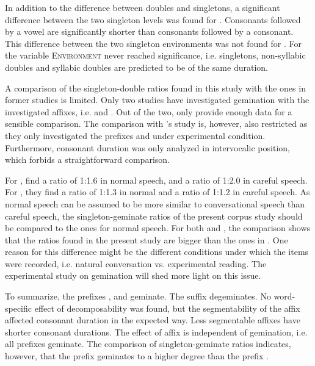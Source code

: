 In addition to the difference between doubles and singletons, a significant difference between the two singleton levels was found for . Consonants followed by a vowel are significantly shorter than consonants followed by a consonant. This difference between the two singleton environments was not found for . For  the variable \textsc{Environment} never reached significance, i.e. singletons, non-syllabic doubles and syllabic doubles are predicted to be of the same duration.

 A comparison of the singleton-double ratios found in this study with the ones in former studies is limited. Only two studies have investigated gemination with the investigated affixes, i.e. \cite{Kaye.2005} and \cite{Oh.2012}. Out of the two, only \cite{Oh.2012} provide enough data for a sensible comparison. The comparison with \citeauthor{Oh.2012}'s study is, however, also restricted as they only investigated the prefixes  and  under experimental condition. Furthermore, consonant duration was only analyzed in intervocalic position, which forbids a straightforward comparison. 
 
 For , \cite{Oh.2012} find a ratio of 1:1.6 in normal speech, and a ratio of 1:2.0 in careful speech. For , they find a ratio of 1:1.3 in normal and a ratio of 1:1.2 in careful speech. 
 As normal speech can be assumed to be more similar to conversational speech than careful speech, the singleton-geminate ratios of the present corpus study should be compared to the ones for normal speech. 
 For both  and , the comparison shows that the ratios found in the present study are bigger than the ones in \cite{Oh.2012}. 
  One reason for this difference might be the different conditions under which the items were recorded, i.e. natural conversation vs. experimental reading. The experimental study on gemination will shed more light on this issue.

To summarize, the prefixes ,  and  geminate. The suffix  degeminates. No word-specific effect of decomposability was found, but the segmentability of the affix affected consonant duration in the expected way. Less segmentable affixes have shorter consonant durations. The effect of affix is independent of gemination, i.e. all prefixes geminate. The comparison of singleton-geminate ratios indicates, however, that the prefix  geminates to a higher degree than the prefix .


